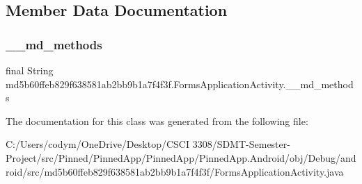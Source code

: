 \subsection{Member Data Documentation}
\mbox{\label{classmd5b60ffeb829f638581ab2bb9b1a7f4f3f_1_1_forms_application_activity_a37d533299315e969b66527bb86dba664}} 
\subsubsection{\texorpdfstring{\+\_\+\+\_\+md\+\_\+methods}{\_\_md\_methods}}
{\footnotesize\ttfamily final String md5b60ffeb829f638581ab2bb9b1a7f4f3f.\+Forms\+Application\+Activity.\+\_\+\+\_\+md\+\_\+methods\hspace{0.3cm}{\ttfamily [static]}}



The documentation for this class was generated from the following file\+:\begin{DoxyCompactItemize}
\item 
C\+:/\+Users/codym/\+One\+Drive/\+Desktop/\+C\+S\+C\+I 3308/\+S\+D\+M\+T-\/\+Semester-\/\+Project/src/\+Pinned/\+Pinned\+App/\+Pinned\+App/\+Pinned\+App.\+Android/obj/\+Debug/android/src/md5b60ffeb829f638581ab2bb9b1a7f4f3f/Forms\+Application\+Activity.\+java\end{DoxyCompactItemize}
